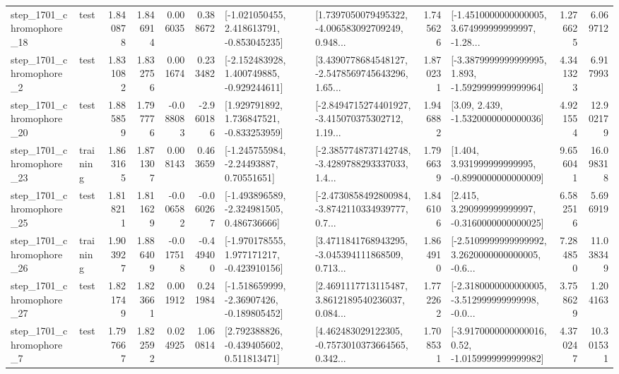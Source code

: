 \begin{tabular}{llrrrrllrlrr}
 step\_1701\_chromophore\_18 &      test &      1.840878 &    1.846914 &      0.006035 &  0.388672 &   [-1.021050455, 2.418613791, -0.853045235] &  [1.7397050079495322, -4.006583092709249, 0.948... &       1.745626 &  [-1.4510000000000005, 3.674999999999997, -1.28... &            1.276625 &          6.069712 \\
  step\_1701\_chromophore\_2 &      test &      1.831082 &    1.832756 &      0.001674 &  0.233482 &   [-2.152483928, 1.400749885, -0.929244611] &  [3.4390778684548127, -2.5478569745643296, 1.65... &       1.870231 &  [-3.3879999999999995, 1.893, -1.5929999999999964] &            4.341323 &          6.917993 \\
 step\_1701\_chromophore\_20 &      test &      1.885859 &    1.797776 &     -0.088083 & -2.960186 &    [1.929791892, 1.736847521, -0.833253959] &  [-2.8494715274401927, -3.415070375302712, 1.19... &       1.946882 &                 [3.09, 2.439, -1.5320000000000036] &            4.921554 &         12.902179 \\
 step\_1701\_chromophore\_23 &  training &      1.863165 &    1.871307 &      0.008143 &  0.463659 &     [-1.245755984, -2.24493887, 0.70551651] &  [-2.3857748737142748, -3.4289788293337033, 1.4... &       1.796639 &    [1.404, 3.931999999999995, -0.8990000000000009] &            9.656041 &         16.098318 \\
 step\_1701\_chromophore\_25 &      test &      1.818211 &    1.811629 &     -0.006582 & -0.060267 &   [-1.493896589, -2.324981505, 0.486736666] &  [-2.4730858492800984, -3.8742110334939777, 0.7... &       1.846106 &    [2.415, 3.290999999999997, -0.3160000000000025] &            6.582516 &          5.696919 \\
 step\_1701\_chromophore\_26 &  training &      1.903927 &    1.886409 &     -0.017518 & -0.449400 &   [-1.970178555, 1.977171217, -0.423910156] &  [3.4711841768943295, -3.045394111868509, 0.713... &       1.864910 &  [-2.5109999999999992, 3.2620000000000005, -0.6... &            7.284850 &         11.038349 \\
 step\_1701\_chromophore\_27 &      test &      1.821749 &    1.823661 &      0.001912 &  0.241984 &   [-1.518659999, -2.36907426, -0.189805452] &  [2.4691117713115487, 3.8612189540236037, 0.084... &       1.772262 &  [-2.3180000000000005, -3.512999999999998, -0.0... &            3.758629 &          1.204163 \\
  step\_1701\_chromophore\_7 &      test &      1.797667 &    1.822592 &      0.024925 &  1.060814 &    [2.792388826, -0.439405602, 0.511813471] &  [4.462483029122305, -0.7573010373664565, 0.342... &       1.708531 &   [-3.9170000000000016, 0.52, -1.0159999999999982] &            4.370247 &         10.301531 \\

\end{tabular}
